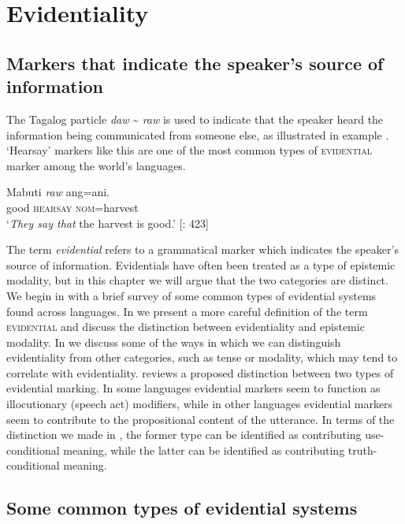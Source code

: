 \chapter{Evidentiality}\label{sec:17}

\section{Markers that indicate the speaker’s source of information}\label{sec:17.1}
The Tagalog particle \textit{daw} {\textasciitilde} \textit{raw} is used to indicate that the speaker heard the information being communicated from someone else, as illustrated in example . ‘Hearsay’ markers like this are one of the most common types of \textsc{evidential} marker among the world’s languages.


\ea \label{ex:17.1}
\gll Mabuti  \textit{raw}  ang=ani.\\
good  \textsc{hearsay}  \textsc{nom}=harvest\\
\glt ‘\textit{They say that} the harvest is good.’   [\citealt{SchachterOtanes1972}: 423]
\z


The term \textit{evidential} refers to a grammatical marker which indicates the speaker’s source of information. Evidentials have often been treated as a type of epistemic modality, but in this chapter we will argue that the two categories are distinct. We begin in  with a brief survey of some common types of evidential systems found across languages. In  we present a more careful definition of the term \textsc{evidential} and discuss the distinction between evidentiality and epistemic modality. In  we discuss some of the ways in which we can distinguish evidentiality from other categories, such as tense or modality, which may tend to correlate with evidentiality.  reviews a proposed distinction between two types of evidential marking. In some languages evidential markers seem to function as illocutionary (speech act) modifiers, while in other languages evidential markers seem to contribute to the propositional content of the utterance. In terms of the distinction we made in , the former type can be identified as contributing use-conditional meaning, while the latter can be identified as contributing truth-conditional meaning.


\section{Some common types of evidential systems}\label{sec:17.2}

